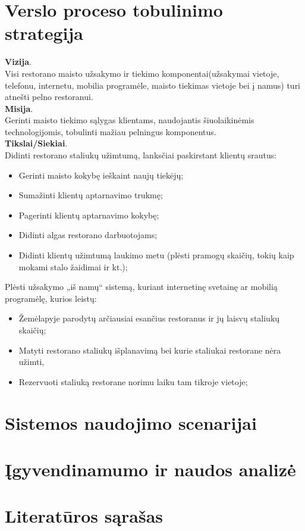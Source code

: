 \documentclass{VUMIFPSkursinis}
\begin{document}
\section{Verslo proceso tobulinimo strategija}
\noindent \textbf{Vizija}.\\
Visi restorano maisto užsakymo ir tiekimo komponentai(užsakymai vietoje, telefonu, internetu, mobilia programėle, maisto tiekimas vietoje bei į namus) turi atnešti pelno restoranui.\\
\textbf{Misija}.\\
Gerinti maisto tiekimo sąlygas klientams, naudojantis šiuolaikinėmis technologijomis, tobulinti mažiau pelningus komponentus.\\
\textbf{Tikslai/Siekiai}.\\
Didinti restorano staliukų užimtumą, lanksčiai paskirstant klientų srautus:
	\begin{itemize}
	\item Gerinti maisto kokybę ieškaint naujų tiekėjų;
	\item Sumažinti klientų aptarnavimo trukmę;
	\item Pagerinti klientų aptarnavimo kokybę;
	\item Didinti algas restorano darbuotojams;
	\item Didinti klientų užimtumą laukimo metu (plėsti pramogų skaičių, tokių kaip mokami stalo žaidimai ir kt.);
	\end{itemize}
Plėsti užsakymo „iš namų“ sistemą, kuriant internetinę svetainę ar mobilią programėlę, kurios leistų:
	\begin{itemize}
	\item Žemėlapyje parodytų arčiausiai esančius restoranus ir jų laisvų staliukų skaičių;
	\item Matyti restorano staliukų išplanavimą bei kurie staliukai restorane nėra užimti,
	\item Rezervuoti staliuką restorane norimu laiku tam tikroje vietoje;
	\end{itemize}

\section{Sistemos naudojimo scenarijai}

\section{Įgyvendinamumo ir naudos analizė}

\section{Literatūros sąrašas}
\end{document}
